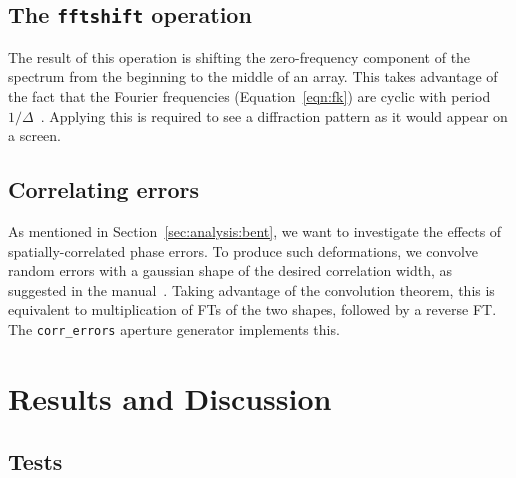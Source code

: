 \documentclass[11pt]{article}
\begin{document}
\subsection{The \texttt{fftshift} operation}
The result of this operation is shifting the zero-frequency component of the spectrum from the beginning to the middle of an array. This takes advantage of the fact that the Fourier frequencies (Equation~\ref{eqn:fk}) are cyclic with period $1/\Delta$~\cite[Section~12.1.2]{NumRecipes}. Applying this is required to see a diffraction pattern as it would appear on a screen.

\subsection{Correlating errors}
As mentioned in Section~\ref{sec:analysis:bent}, we want to investigate the effects of spatially-correlated phase errors. To produce such deformations, we convolve random errors with a gaussian shape of the desired correlation width, as suggested in the manual~\cite{manual}. Taking advantage of the convolution theorem, this is equivalent to multiplication of FTs of the two shapes, followed by a reverse FT. The \texttt{corr\_errors} aperture generator implements this.

\section{Results and Discussion}\label{sec:res}
\subsection{Tests}
\end{document}
